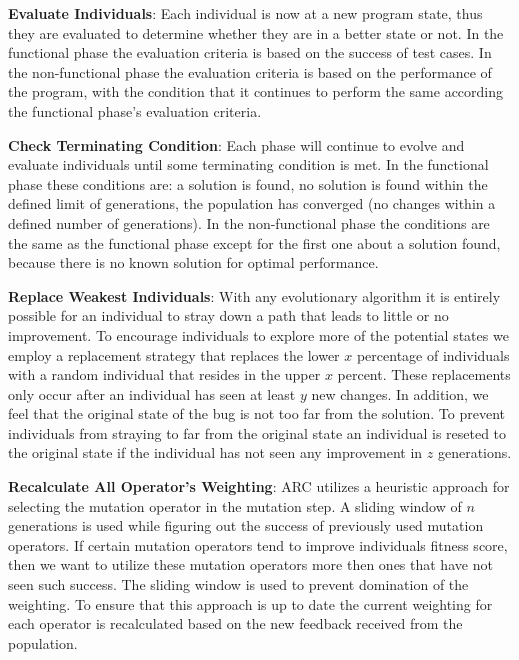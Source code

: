 \documentclass[10pt, conference, compsocconf]{IEEEtran}
\begin{document}
\textbf{Evaluate Individuals}: Each individual is now at a new program state,
thus they are evaluated to determine whether they are in a better state or not.
In the functional phase the evaluation criteria is based on the success of test
cases. In the non-functional phase the evaluation criteria is based on the
performance of the program, with the condition that it continues to perform the
same according the functional phase's evaluation criteria.

\textbf{Check Terminating Condition}: Each phase will continue to evolve and
evaluate individuals until some terminating condition is met. In the functional
phase these conditions are: a solution is found, no solution is found within
the defined limit of generations, the population has converged (no changes
within a defined number of generations). In the non-functional phase the
conditions are the same as the functional phase except for the first one about
a solution found, because there is no known solution for optimal performance.

\textbf{Replace Weakest Individuals}: With any evolutionary algorithm it is
entirely possible for an individual to stray down a path that leads to little
or no improvement. To encourage individuals to explore more of the potential
states we employ a replacement strategy that replaces the lower $x$ percentage
of individuals with a random individual that resides in the upper $x$ percent.
These replacements only occur after an individual has seen at least $y$ new
changes. In addition, we feel that the original state of the bug is not too far
from the solution. To prevent individuals from straying to far from the
original state an individual is reseted to the original state if the individual
has not seen any improvement in $z$ generations.

\textbf{Recalculate All Operator's Weighting}: ARC utilizes a heuristic
approach for selecting the mutation operator in the mutation step. A sliding
window of $n$ generations is used while figuring out the success of previously
used mutation operators. If certain mutation operators tend to improve
individuals fitness score, then we want to utilize these mutation operators
more then ones that have not seen such success. The sliding window is used to
prevent domination of the weighting. To ensure that this approach is up to date
the current weighting for each operator is recalculated based on the new
feedback received from the population.
\end{document}
